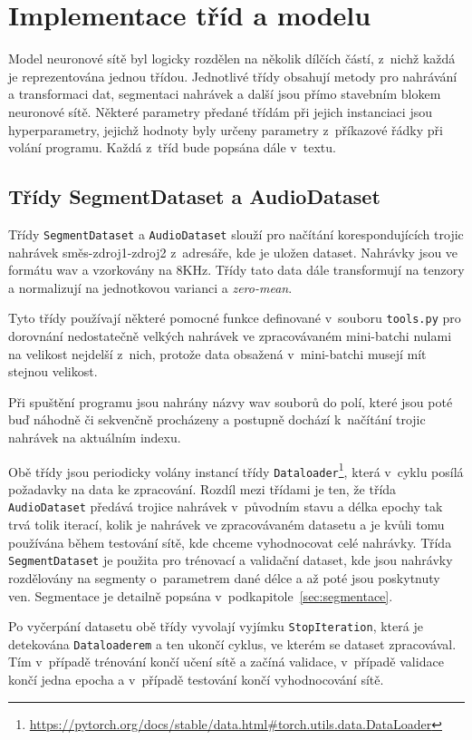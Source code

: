 \section{Implementace tříd a modelu}
Model neuronové sítě byl logicky rozdělen na několik dílčích částí, z~nichž každá je reprezentována jednou třídou. Jednotlivé třídy obsahují metody pro nahrávání a transformaci dat, segmentaci nahrávek a další jsou přímo stavebním blokem neuronové sítě. Některé parametry předané třídám při jejich instanciaci jsou hyperparametry, jejichž hodnoty byly určeny parametry z~příkazové řádky při volání programu. Každá z~tříd bude popsána dále v~textu.


\subsection*{Třídy SegmentDataset a AudioDataset}
Třídy \texttt{SegmentDataset} a \texttt{AudioDataset} slouží pro načítání korespondujících trojic nahrávek směs-zdroj1-zdroj2 z~adresáře, kde je uložen dataset. Nahrávky jsou ve formátu wav a vzorkovány na 8KHz. Třídy tato data dále transformují na tenzory a normalizují na jednotkovou varianci a \textit{zero-mean}. 

Tyto třídy používají některé pomocné funkce definované v~souboru \texttt{tools.py} pro dorovnání nedostatečně velkých nahrávek ve zpracovávaném mini-batchi nulami na velikost nejdelší z~nich, protože data obsažená v~mini-batchi musejí mít stejnou velikost.

Při spuštění programu jsou nahrány názvy wav souborů do polí, které jsou poté buď náhodně či sekvenčně procházeny a postupně dochází k~načítání trojic nahrávek na aktuálním indexu. 

Obě třídy jsou periodicky volány instancí třídy \texttt{Dataloader}\footnote{\url{https://pytorch.org/docs/stable/data.html\#torch.utils.data.DataLoader}}, která v~cyklu posílá požadavky na data ke zpracování. Rozdíl mezi třídami je ten, že třída \texttt{AudioDataset} předává trojice nahrávek v~původním stavu a délka epochy tak trvá tolik iterací, kolik je nahrávek ve zpracovávaném datasetu a je kvůli tomu používána během testování sítě, kde chceme vyhodnocovat celé nahrávky. Třída \texttt{SegmentDataset} je použita pro trénovací a validační dataset, kde jsou nahrávky rozdělovány na segmenty o~parametrem dané délce a až poté jsou poskytnuty ven. Segmentace je detailně popsána v~podkapitole~\ref{sec:segmentace}.

Po vyčerpání datasetu obě třídy vyvolají vyjímku \texttt{StopIteration}, která je detekována \texttt{Dataloaderem} a ten ukončí cyklus, ve kterém se dataset zpracovával. Tím v~případě trénování končí učení sítě a začíná validace, v~případě validace končí jedna epocha a v~případě testování končí vyhodnocování sítě.


